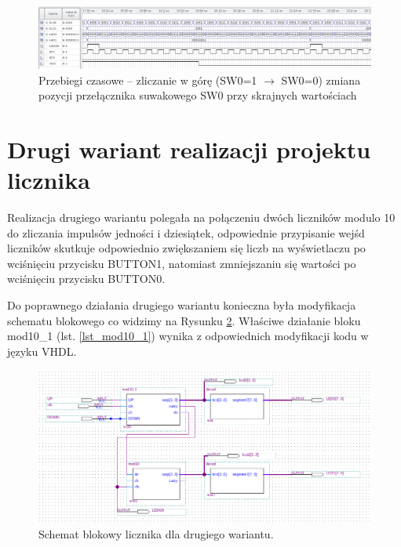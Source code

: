 \documentclass{classrep}
\begin{document}
\begin{figure}[H]
	\centering
	\includegraphics[width=1.0\linewidth]{up_down_inv_2}
	\caption{Przebiegi czasowe – zliczanie w górę (SW0=1 $\longrightarrow$ SW0=0) zmiana pozycji przełącznika suwakowego SW0 przy skrajnych wartościach }
	\label{fig:symhex3}
\end{figure}

\section{ Drugi wariant realizacji projektu licznika}

Realizacja drugiego wariantu polegała na połączeniu dwóch liczników modulo 10 do zliczania
impulsów jedności i dziesiątek, odpowiednie przypisanie wejśd liczników skutkuje odpowiednio
zwiększaniem się liczb na wyświetlaczu po wciśnięciu przycisku BUTTON1, natomiast zmniejszaniu się
wartości po wciśnięciu przycisku BUTTON0.

Do poprawnego działania drugiego wariantu konieczna była modyfikacja schematu blokowego co
widzimy na Rysunku \ref{fig:block1}. Właściwe działanie bloku mod10\_1 (lst. \ref{lst_mod10_1}) wynika z odpowiednich modyfikacji
kodu w języku VHDL.\\

\begin{figure}[H]  %
	\centering
	\includegraphics[width=1.0\linewidth]{blok1}  %
	\caption{ Schemat blokowy licznika dla drugiego wariantu. }
	\label{fig:block1}
\end{figure}
\end{document}
